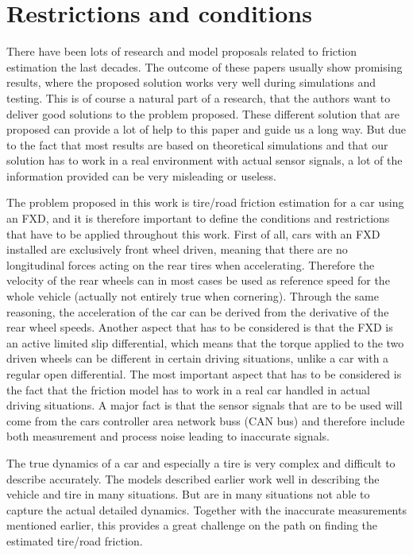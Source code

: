 \section{Restrictions and conditions}
There have been lots of research and model proposals related to friction estimation the last decades. The outcome of these papers usually show promising results, where the proposed solution works very well during simulations and testing. This is of course a natural part of a research, that the authors want to deliver good solutions to the problem proposed. These different solution that are proposed can provide a lot of help to this paper and guide us a long way. But due to the fact that most results are based on theoretical simulations and that our solution has to work in a real environment with actual sensor signals, a lot of the information provided can be very misleading or useless. 

The problem proposed in this work is tire/road friction estimation for a car using an FXD, and it is therefore important to define the conditions and restrictions that have to be applied throughout this work. First of all, cars with an FXD installed are exclusively front wheel driven, meaning that there are no longitudinal forces acting on the rear tires when accelerating. Therefore the velocity of the rear wheels can in most cases be used as reference speed for the whole vehicle (actually not entirely true when cornering). Through the same reasoning, the acceleration of the car can be derived from the derivative of the rear wheel speeds. Another aspect that has to be considered is that the FXD is an active limited slip differential, which means that the torque applied to the two driven wheels can be different in certain driving situations, unlike a car with a regular open differential. The most important aspect that has to be considered is the fact that the friction model has to work in a real car handled in actual driving situations. A major fact is that the sensor signals that are to be used  will come from the cars controller area network buss (CAN bus) and therefore include both measurement and process noise leading to inaccurate signals. 

The true dynamics of a car and especially a tire is very complex and difficult to describe accurately. The models described earlier work well in describing the vehicle and tire in many situations. But are in many situations not able to capture the actual detailed dynamics. Together with the inaccurate measurements mentioned earlier, this provides a great challenge on the path on finding the estimated tire/road friction. 

